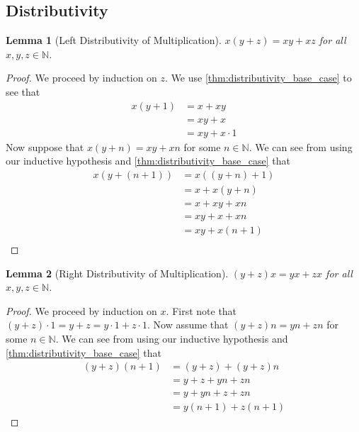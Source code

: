 \documentclass{article}
\theoremstyle{definition}
\theoremstyle{definition}
\theoremstyle{plain}
\theoremstyle{remark}
\theoremstyle{plain}
\theoremstyle{remark}
\theoremstyle{plain}
\newtheorem{lemma}{Lemma}[section]
\theoremstyle{plain}
\theoremstyle{plain}
\theoremstyle{plain}
\begin{document}
\subsection{Distributivity}

\begin{lemma}[Left Distributivity of Multiplication]
   \( x (y + z) =  xy + xz \) for all \( x, y, z \in \mathbb{N} \).
   \label{thm:left_distributivity}
\end{lemma}

\begin{proof}
  We proceed by induction on \( z \). We use 
  \autoref{thm:distributivity_base_case} to see that
  \begin{align*}
    x(y+1) &= x + xy \\
           &= xy + x \\
           &= xy + x \cdot 1   
  \end{align*}
  Now suppose that \( x (y + n) = xy + xn \) for some \( n \in \mathbb{N} \). We 
  can see from using our inductive hypothesis and 
  \autoref{thm:distributivity_base_case} that 
  \begin{align*}
    x(y+(n+1)) &= x((y + n) + 1) \\
               &= x + x(y + n) \\
               &= x + xy + xn \\
               &= xy + x + xn \\
               &= xy + x ( n + 1) \\
  \end{align*}
\end{proof}

\begin{lemma}[Right Distributivity of Multiplication]
  \( (y + z)x = yx + zx \) for all \( x, y, z \in \mathbb{N} \). 
  \label{thm:right_distributivity}
\end{lemma}

\begin{proof}
  We proceed by induction on \( x \). First note that 
  \( (y + z) \cdot 1 = y + z = y \cdot 1 + z \cdot 1 \). Now assume that 
  \( (y + z)n = yn + zn \) for some \( n \in \mathbb{N} \). We 
  can see from using our inductive hypothesis and 
  \autoref{thm:distributivity_base_case} that 
  \begin{align*}
    (y + z)(n+1) &= (y + z) + (y + z)n \\
                 &= y + z + yn + zn \\
                 &= y + yn + z + zn \\
                 &= y(n+1) + z(n+1) 
  \end{align*}
\end{proof}
\end{document}
